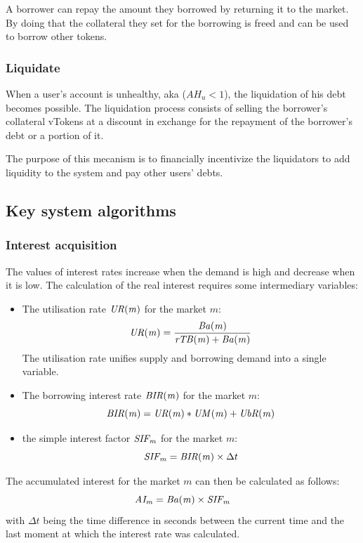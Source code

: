 A borrower can repay the amount they borrowed by returning it to the market. By doing that the collateral they set for the borrowing is freed and can be used to borrow other tokens.

\subsubsection{Liquidate}
When a user's account is unhealthy, aka ($AH_u < 1$), the liquidation of his debt becomes possible. The liquidation process consists of selling the borrower's collateral vTokens at a discount in exchange for the repayment of the borrower's debt or a portion of it.

The purpose of this mecanism is to financially incentivize the liquidators to add liquidity to the system and pay other users' debts.

\subsection{Key system algorithms}

\subsubsection{Interest acquisition}

The values of interest rates increase when the demand is high and decrease when it is low. The calculation of the real interest requires some intermediary variables:

\begin{itemize}
  \item The utilisation rate $\mathit{UR(m)}$ for the market $m$:
  $$
    \mathit{UR(m)} = \frac{ \mathit{Ba(m)} }{ \mathit{rTB(m)} + \mathit{Ba(m)} }
  $$
  The utilisation rate unifies supply and borrowing demand into a single variable.
  \item The borrowing interest rate $\mathit{BIR(m)}$ for the market $m$:
  $$
    \mathit{BIR(m)} = \mathit{UR(m)} * \mathit{UM(m)} + \mathit{UbR(m)}
  $$ %
  \item the simple interest factor $\mathit{SIF_{m}}$ for the market $m$:
  $$
    \mathit{SIF_{m}} = \mathit{BIR(m)} \times \Delta t
  $$
\end{itemize}
The accumulated interest for the market $m$ can then be calculated as follows:
$$
  \mathit{AI_{m}} = \mathit{Ba(m)} \times \mathit{SIF_{m}}
$$ %
with $\Delta t$ being the time difference in seconds between the current time and the last moment at which the interest rate was calculated.

